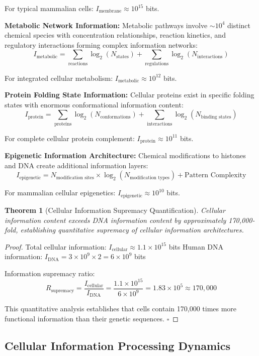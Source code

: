 \documentclass[12pt,a4paper]{article}
\newtheorem{theorem}{Theorem}[section]
\begin{document}
For typical mammalian cells: $I_{\text{membrane}} \approx 10^{15}$ bits.

\textbf{Metabolic Network Information:}
Metabolic pathways involve $\sim 10^4$ distinct chemical species with concentration relationships, reaction kinetics, and regulatory interactions forming complex information networks:
$$I_{\text{metabolic}} = \sum_{\text{reactions}} \log_2(N_{\text{states}}) + \sum_{\text{regulations}} \log_2(N_{\text{interactions}})$$

For integrated cellular metabolism: $I_{\text{metabolic}} \approx 10^{12}$ bits.

\textbf{Protein Folding State Information:}
Cellular proteins exist in specific folding states with enormous conformational information content:
$$I_{\text{protein}} = \sum_{\text{proteins}} \log_2(N_{\text{conformations}}) + \sum_{\text{interactions}} \log_2(N_{\text{binding states}})$$

For complete cellular protein complement: $I_{\text{protein}} \approx 10^{11}$ bits.

\textbf{Epigenetic Information Architecture:}
Chemical modifications to histones and DNA create additional information layers:
$$I_{\text{epigenetic}} = N_{\text{modification sites}} \times \log_2(N_{\text{modification types}}) + \text{Pattern Complexity}$$

For mammalian cellular epigenetics: $I_{\text{epigenetic}} \approx 10^{10}$ bits.

\begin{theorem}[Cellular Information Supremacy Quantification]
Cellular information content exceeds DNA information content by approximately 170,000-fold, establishing quantitative supremacy of cellular information architectures.
\end{theorem}

\begin{proof}
Total cellular information: $I_{\text{cellular}} \approx 1.1 \times 10^{15}$ bits
Human DNA information: $I_{\text{DNA}} = 3 \times 10^9 \times 2 = 6 \times 10^9$ bits

Information supremacy ratio:
$$R_{\text{supremacy}} = \frac{I_{\text{cellular}}}{I_{\text{DNA}}} = \frac{1.1 \times 10^{15}}{6 \times 10^9} = 1.83 \times 10^5 \approx 170,000$$

This quantitative analysis establishes that cells contain 170,000 times more functional information than their genetic sequences. $\square$
\end{proof}

\subsection{Cellular Information Processing Dynamics}
\end{document}
